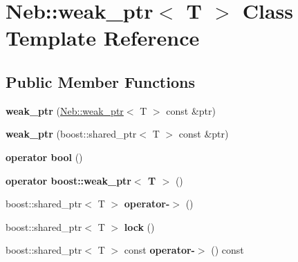 \hypertarget{classNeb_1_1weak__ptr}{\section{\-Neb\-:\-:weak\-\_\-ptr$<$ \-T $>$ \-Class \-Template \-Reference}
\label{classNeb_1_1weak__ptr}
}
\subsection*{\-Public \-Member \-Functions}
\begin{DoxyCompactItemize}
\item 
\hypertarget{classNeb_1_1weak__ptr_a831fec6c1355a9d91e834099c0dc6227}{{\bfseries weak\-\_\-ptr} (\hyperlink{classNeb_1_1weak__ptr}{\-Neb\-::weak\-\_\-ptr}$<$ \-T $>$ const \&ptr)}\label{classNeb_1_1weak__ptr_a831fec6c1355a9d91e834099c0dc6227}

\item 
\hypertarget{classNeb_1_1weak__ptr_ad29ba574546701e7ed8a0b452dcd76a6}{{\bfseries weak\-\_\-ptr} (boost\-::shared\-\_\-ptr$<$ \-T $>$ const \&ptr)}\label{classNeb_1_1weak__ptr_ad29ba574546701e7ed8a0b452dcd76a6}

\item 
\hypertarget{classNeb_1_1weak__ptr_a04c92f7e5ec8e3e83d2abce8365b8feb}{{\bfseries operator bool} ()}\label{classNeb_1_1weak__ptr_a04c92f7e5ec8e3e83d2abce8365b8feb}

\item 
\hypertarget{classNeb_1_1weak__ptr_ab67828010c104deb340eb460148b651d}{{\bfseries operator boost\-::weak\-\_\-ptr$<$ T $>$} ()}\label{classNeb_1_1weak__ptr_ab67828010c104deb340eb460148b651d}

\item 
\hypertarget{classNeb_1_1weak__ptr_afb380fd10451d5f26809091e54cde62f}{boost\-::shared\-\_\-ptr$<$ \-T $>$ {\bfseries operator-\/$>$} ()}\label{classNeb_1_1weak__ptr_afb380fd10451d5f26809091e54cde62f}

\item 
\hypertarget{classNeb_1_1weak__ptr_a2ec9a930e2ea181d3aa1d72d178b8a75}{boost\-::shared\-\_\-ptr$<$ \-T $>$ {\bfseries lock} ()}\label{classNeb_1_1weak__ptr_a2ec9a930e2ea181d3aa1d72d178b8a75}

\item 
\hypertarget{classNeb_1_1weak__ptr_af950ca38e1c55c8b428d6969cebcc189}{boost\-::shared\-\_\-ptr$<$ \-T $>$ const {\bfseries operator-\/$>$} () const }\label{classNeb_1_1weak__ptr_af950ca38e1c55c8b428d6969cebcc189}

\end{DoxyCompactItemize}
